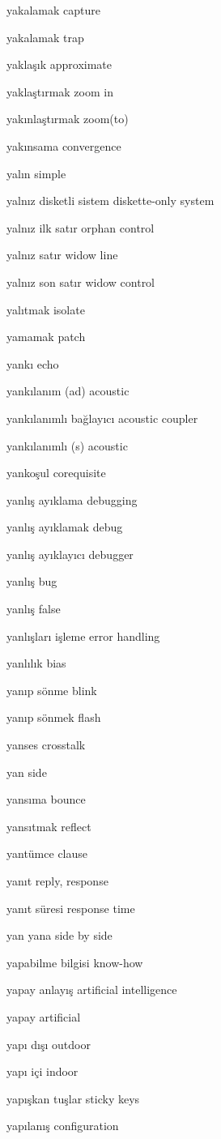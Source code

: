 \documentclass[12pt,fleqn]{article}\usepackage{../../common}
\begin{document}
yakalamak capture

yakalamak trap

yaklaşık approximate

yaklaştırmak zoom in

yakınlaştırmak zoom(to)

yakınsama convergence

yalın simple

yalnız disketli sistem diskette-only system

yalnız ilk satır orphan control

yalnız satır widow line

yalnız son satır widow control

yalıtmak isolate

yamamak patch

yankı echo

yankılanım (ad) acoustic

yankılanımlı bağlayıcı acoustic coupler

yankılanımlı (s) acoustic

yankoşul corequisite

yanlış ayıklama debugging

yanlış ayıklamak debug

yanlış ayıklayıcı debugger

yanlış bug

yanlış false

yanlışları işleme error handling

yanlılık bias

yanıp sönme blink

yanıp sönmek flash

yanses crosstalk

yan side

yansıma bounce

yansıtmak reflect

yantümce clause

yanıt reply, response

yanıt süresi response time

yan yana side by side

yapabilme bilgisi know-how

yapay anlayış artificial intelligence

yapay artificial

yapı dışı outdoor

yapı içi indoor

yapışkan tuşlar sticky keys

yapılanış configuration
\end{document}
